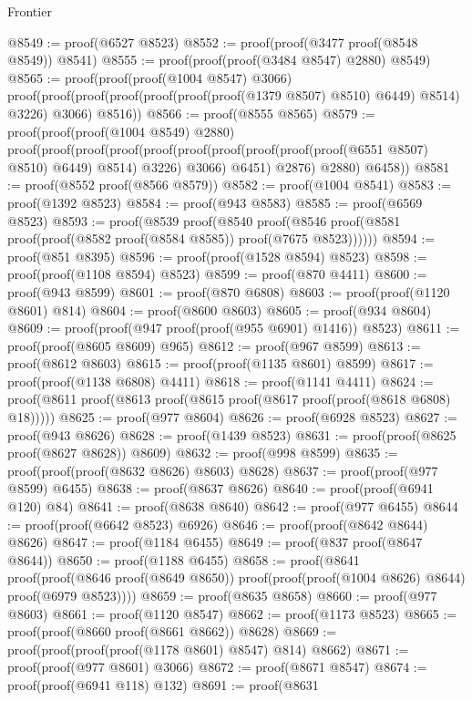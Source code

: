 \begin{lexlean}{Frontier}
\begin{coremodule}
@8549 := proof(@6527 @8523)
@8552 := proof(proof(@3477 proof(@8548 @8549)) @8541)
@8555 := proof(proof(proof(@3484 @8547) @2880) @8549)
@8565 := proof(proof(proof(@1004 @8547) @3066)
      proof(proof(proof(proof(proof(proof(proof(@1379 @8507) @8510) @6449) @8514) @3226) @3066)
          @8516))
@8566 := proof(@8555 @8565)
@8579 := proof(proof(proof(@1004 @8549) @2880)
      proof(proof(proof(proof(proof(proof(proof(proof(proof(proof(@6551 @8507) @8510) @6449) @8514)
                    @3226)
                  @3066)
                @6451)
              @2876)
            @2880)
          @6458))
@8581 := proof(@8552 proof(@8566 @8579))
@8582 := proof(@1004 @8541)
@8583 := proof(@1392 @8523)
@8584 := proof(@943 @8583)
@8585 := proof(@6569 @8523)
@8593 := proof(@8539
      proof(@8540
          proof(@8546 proof(@8581 proof(proof(@8582 proof(@8584 @8585)) proof(@7675 @8523))))))
@8594 := proof(@851 @8395)
@8596 := proof(proof(@1528 @8594) @8523)
@8598 := proof(proof(@1108 @8594) @8523)
@8599 := proof(@870 @4411)
@8600 := proof(@943 @8599)
@8601 := proof(@870 @6808)
@8603 := proof(proof(@1120 @8601) @814)
@8604 := proof(@8600 @8603)
@8605 := proof(@934 @8604)
@8609 := proof(proof(@947 proof(proof(@955 @6901) @1416)) @8523)
@8611 := proof(proof(@8605 @8609) @965)
@8612 := proof(@967 @8599)
@8613 := proof(@8612 @8603)
@8615 := proof(proof(@1135 @8601) @8599)
@8617 := proof(proof(@1138 @6808) @4411)
@8618 := proof(@1141 @4411)
@8624 := proof(@8611 proof(@8613 proof(@8615 proof(@8617 proof(proof(@8618 @6808) @18)))))
@8625 := proof(@977 @8604)
@8626 := proof(@6928 @8523)
@8627 := proof(@943 @8626)
@8628 := proof(@1439 @8523)
@8631 := proof(proof(@8625 proof(@8627 @8628)) @8609)
@8632 := proof(@998 @8599)
@8635 := proof(proof(proof(@8632 @8626) @8603) @8628)
@8637 := proof(proof(@977 @8599) @6455)
@8638 := proof(@8637 @8626)
@8640 := proof(proof(@6941 @120) @84)
@8641 := proof(@8638 @8640)
@8642 := proof(@977 @6455)
@8644 := proof(proof(@6642 @8523) @6926)
@8646 := proof(proof(@8642 @8644) @8626)
@8647 := proof(@1184 @6455)
@8649 := proof(@837 proof(@8647 @8644))
@8650 := proof(@1188 @6455)
@8658 := proof(@8641
      proof(proof(@8646 proof(@8649 @8650))
          proof(proof(proof(@1004 @8626) @8644) proof(@6979 @8523))))
@8659 := proof(@8635 @8658)
@8660 := proof(@977 @8603)
@8661 := proof(@1120 @8547)
@8662 := proof(@1173 @8523)
@8665 := proof(proof(@8660 proof(@8661 @8662)) @8628)
@8669 := proof(proof(proof(proof(@1178 @8601) @8547) @814) @8662)
@8671 := proof(proof(@977 @8601) @3066)
@8672 := proof(@8671 @8547)
@8674 := proof(proof(@6941 @118) @132)
@8691 := proof(@8631

\end{coremodule}
\end{lexlean}
